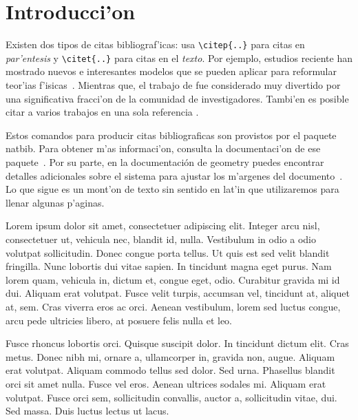 \documentclass[tesis.tex]{subfiles}
\begin{document}

\chapter{Introducci'on}

Existen dos tipos de citas bibliograf'icas: usa \verb|\citep{..}| para
citas en \emph{par'entesis} y \verb|\citet{..}| para citas
en el \emph{texto}. Por ejemplo, estudios reciente han mostrado nuevos e
interesantes modelos que se pueden aplicar para reformular teor'ias
f'isicas~\citep{NewCam97}. Mientras que, el trabajo de \citet{Rofl06} fue
considerado muy divertido por una significativa fracci'on de la comunidad
de investigadores. Tambi'en es posible citar a varios trabajos en una sola
referencia \citep{Lamport86,Knuth84}.

Estos comandos para producir citas bibliograficas son provistos por
el paquete \textsf{natbib}. Para obtener m'as informaci'on, consulta la
documentaci'on de ese paquete~\citep{doc:natbib}. Por su parte, en
la documentaci\'on de \textsf{geometry} puedes encontrar detalles
adicionales sobre el sistema para ajustar los m'argenes del
documento~\citep{doc:geometry}. Lo que sigue
es un mont'on de texto sin sentido en lat'in que utilizaremos para llenar
algunas p'aginas.

Lorem ipsum dolor sit amet, consectetuer adipiscing elit. Integer arcu nisl,
consectetuer ut, vehicula nec, blandit id, nulla. Vestibulum in odio a odio
volutpat sollicitudin. Donec congue porta tellus. Ut quis est sed velit
blandit fringilla. Nunc lobortis dui vitae sapien. In tincidunt magna eget
purus. Nam lorem quam, vehicula in, dictum et, congue eget, odio. Curabitur
gravida mi id dui. Aliquam erat volutpat. Fusce velit turpis, accumsan vel,
tincidunt at, aliquet at, sem. Cras viverra eros ac orci. Aenean vestibulum,
lorem sed luctus congue, arcu pede ultricies libero, at posuere felis nulla
et leo.

Fusce rhoncus lobortis orci. Quisque suscipit dolor. In tincidunt dictum
elit. Cras metus. Donec nibh mi, ornare a, ullamcorper in, gravida non,
augue. Aliquam erat volutpat. Aliquam commodo tellus sed dolor. Sed urna.
Phasellus blandit orci sit amet nulla. Fusce vel eros. Aenean ultrices
sodales mi. Aliquam erat volutpat. Fusce orci sem, sollicitudin convallis,
auctor a, sollicitudin vitae, dui. Sed massa. Duis luctus lectus ut lacus.
\end{document}
